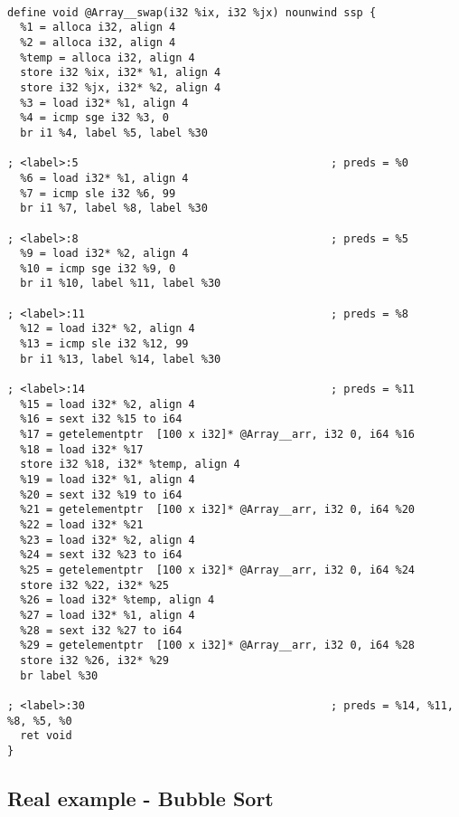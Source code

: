 \documentclass[10pt,a4paper]{article}
\begin{document}
{\begin{verbatim}

define void @Array__swap(i32 %ix, i32 %jx) nounwind ssp {
  %1 = alloca i32, align 4
  %2 = alloca i32, align 4
  %temp = alloca i32, align 4
  store i32 %ix, i32* %1, align 4
  store i32 %jx, i32* %2, align 4
  %3 = load i32* %1, align 4
  %4 = icmp sge i32 %3, 0
  br i1 %4, label %5, label %30

; <label>:5                                       ; preds = %0
  %6 = load i32* %1, align 4
  %7 = icmp sle i32 %6, 99
  br i1 %7, label %8, label %30

; <label>:8                                       ; preds = %5
  %9 = load i32* %2, align 4
  %10 = icmp sge i32 %9, 0
  br i1 %10, label %11, label %30

; <label>:11                                      ; preds = %8
  %12 = load i32* %2, align 4
  %13 = icmp sle i32 %12, 99
  br i1 %13, label %14, label %30

; <label>:14                                      ; preds = %11
  %15 = load i32* %2, align 4
  %16 = sext i32 %15 to i64
  %17 = getelementptr  [100 x i32]* @Array__arr, i32 0, i64 %16
  %18 = load i32* %17
  store i32 %18, i32* %temp, align 4
  %19 = load i32* %1, align 4
  %20 = sext i32 %19 to i64
  %21 = getelementptr  [100 x i32]* @Array__arr, i32 0, i64 %20
  %22 = load i32* %21
  %23 = load i32* %2, align 4
  %24 = sext i32 %23 to i64
  %25 = getelementptr  [100 x i32]* @Array__arr, i32 0, i64 %24
  store i32 %22, i32* %25
  %26 = load i32* %temp, align 4
  %27 = load i32* %1, align 4
  %28 = sext i32 %27 to i64
  %29 = getelementptr  [100 x i32]* @Array__arr, i32 0, i64 %28
  store i32 %26, i32* %29
  br label %30

; <label>:30                                      ; preds = %14, %11, %8, %5, %0
  ret void
}

\end{verbatim}

}


\subsection{Real example - Bubble Sort}
\end{document}
